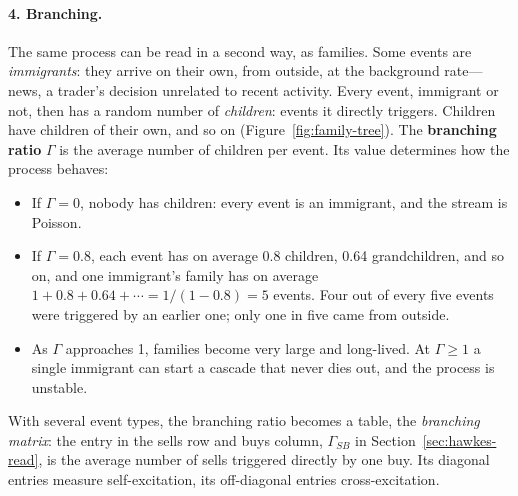 \paragraph{4. Branching.} The same process can be read in a second way, as families.
Some events are \emph{immigrants}: they arrive on their own, from outside, at the background rate---news, a
trader's decision unrelated to recent activity. Every event, immigrant or not, then has a random number of
\emph{children}: events it directly triggers. Children have children of their own, and so on
(Figure~\ref{fig:family-tree}). The \textbf{branching ratio} $\Gamma$ is the average number of children per
event. Its value determines how the process behaves:
\begin{itemize}[leftmargin=1.5em,itemsep=1pt]
\item If $\Gamma = 0$, nobody has children: every event is an immigrant, and the stream is Poisson.
\item If $\Gamma = 0.8$, each event has on average 0.8 children, 0.64 grandchildren, and so on, and one
  immigrant's family has on average $1 + 0.8 + 0.64 + \cdots = 1/(1-0.8) = 5$ events. Four out of every five
  events were triggered by an earlier one; only one in five came from outside.
\item As $\Gamma$ approaches 1, families become very large and long-lived. At $\Gamma \ge 1$ a single immigrant
  can start a cascade that never dies out, and the process is unstable.
\end{itemize}
With several event types, the branching ratio becomes a table, the \emph{branching matrix}: the entry in the
sells row and buys column, $\Gamma_{SB}$ in Section~\ref{sec:hawkes-read}, is the average number of sells triggered directly by one buy. Its diagonal entries measure
self-excitation, its off-diagonal entries cross-excitation.

